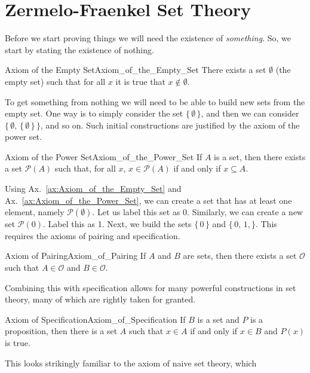 \documentclass[crop=false,class=article]{standalone}                           %
\begin{document}
    \section{Zermelo-Fraenkel Set Theory}
        Before we start proving things we will need the existence of
        \textit{something}. So, we start by stating the existence of nothing.
        \begin{faxiom}{Axiom of the Empty Set}{Axiom_of_the_Empty_Set}
            There exists a set $\emptyset$ (the empty set) such that for
            all $x$ it is true that $x\notin\emptyset$.
        \end{faxiom}
        To get something from nothing we will need to be able to build new sets
        from the empty set. One way is to simply consider the set
        $\{\,\emptyset\,\}$, and then we can consider
        $\{\,\emptyset,\,\{\,\emptyset\,\}\,\}$, and so on. Such initial
        constructions are justified by the axiom of the power set.
        \begin{faxiom}{Axiom of the Power Set}{Axiom_of_the_Power_Set}
            If $A$ is a set, then there exists a set $\mathcal{P}(A)$ such that,
            for all $x$, $x\in\mathcal{P}(A)$ if and only if $x\subseteq{A}$.
        \end{faxiom}
        Using Ax.~\ref{ax:Axiom_of_the_Empty_Set} and
        Ax.~\ref{ax:Axiom_of_the_Power_Set}, we can create a set that has at
        least one element, namely $\mathcal{P}(\emptyset)$. Let us label this
        set as 0. Similarly, we can create a new set $\mathcal{P}(0)$. Label
        this as 1. Next, we build the sets $\{\,0\,\}$ and $\{\,0,\,1,\}$.
        This requires the axioms of pairing and specification.
        \begin{faxiom}{Axiom of Pairing}{Axiom_of_Pairing}
            If $A$ and $B$ are sets, then there exists a set
            $\mathcal{O}$ such that $A\in\mathcal{O}$ and $B\in\mathcal{O}$.
        \end{faxiom}
        Combining this with specification allows for many powerful constructions
        in set theory, many of which are rightly taken for granted.
        \begin{faxiom}{Axiom of Specification}{Axiom_of_Specification}
            If $B$ is a set and $P$ is a proposition, then there is a set
            $A$ such that $x\in{A}$ if and only if $x\in{B}$ and
            $P(x)$ is true.
        \end{faxiom}
        This looks strikingly familiar to the axiom of naive set theory, which
\end{document}
